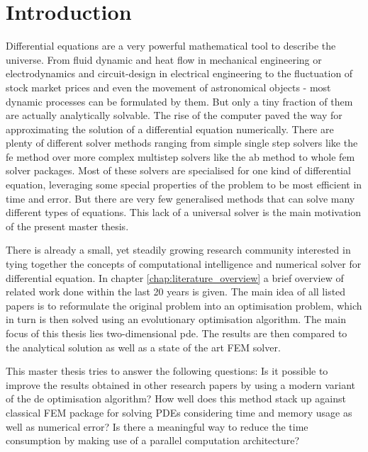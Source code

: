 \documentclass[./\jobname.tex]{subfiles}
\begin{document}
\chapter{Introduction}

Differential equations are a very powerful mathematical tool to describe the universe. From fluid dynamic and heat flow in mechanical engineering or electrodynamics and circuit-design in electrical engineering to the fluctuation of stock market prices and even the movement of astronomical objects - most dynamic processes can be formulated by them. But only a tiny fraction of them are actually analytically solvable. The rise of the computer paved the way for approximating the solution of a differential equation numerically. There are plenty of different solver methods ranging from simple single step solvers like the \gls{fe} method over more complex multistep solvers like the \gls{ab} method to whole \gls{fem} solver packages. Most of these solvers are specialised for one kind of differential equation, leveraging some special properties of the problem to be most efficient in time and error. But there are very few generalised methods that can solve many different types of equations. This lack of a universal solver is the main motivation of the present master thesis.

There is already a small, yet steadily growing research community interested in tying together the concepts of computational intelligence and numerical solver for differential equation. In chapter \ref{chap:literature_overview} a brief overview of related work done within the last 20 years is given. The main idea of all listed papers is to reformulate the original problem into an optimisation problem, which in turn is then solved using an evolutionary optimisation algorithm. The main focus of this thesis lies two-dimensional \gls{pde}. The results are then compared to the analytical solution as well as a state of the art FEM solver.  

This master thesis tries to answer the following questions: 
Is it possible to improve the results obtained in other research papers by using a modern variant of the \gls{de} optimisation algorithm? How well does this method stack up against classical FEM package for solving PDEs considering time and memory usage as well as numerical error? Is there a meaningful way to reduce the time consumption by making use of a parallel computation architecture? 
\end{document}
